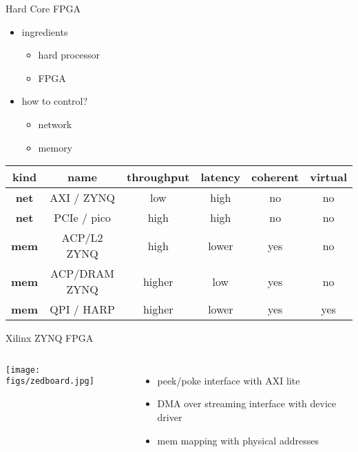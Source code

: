 \begin{frame}[fragile]{Hard Core FPGA}

\begin{itemize}
\item ingredients
\begin{itemize}
\item hard processor 
\item FPGA
\end{itemize}
\item how to control?
\begin{itemize}
\item network
\item memory
\end{itemize}

\end{itemize}

\vspace{0.5cm}

\begin{center}
\begin{footnotesize}
\begin{tabular}{|c|c|c|c|c|c|}
\hline
{\bf kind} & {\bf name} & {\bf throughput} &  {\bf latency} & {\bf coherent} & {\bf virtual} \\
\hline
\hline
{\bf net} & AXI / ZYNQ & low & high & no & no \\
\hline
{\bf net} & PCIe / pico & high & high & no & no \\
\hline
{\bf mem} & ACP/L2 ZYNQ & high & lower & yes & no \\
\hline
{\bf mem} & ACP/DRAM ZYNQ & higher & low & yes & no \\
\hline
{\bf mem} & QPI / HARP & higher & lower & yes & yes \\
\hline
\end{tabular}
\end{footnotesize}
\end{center}

\end{frame}

\begin{frame}[fragile]{Xilinx ZYNQ FPGA}
\begin{columns}
\begin{center}
\texttt{[image: figs/zedboard.jpg]} \\
\end{center}
\begin{itemize}
\item peek/poke interface with AXI lite
\item DMA over streaming interface with device driver
\item mem mapping with physical addresses
\end{itemize}
\end{columns}
\end{frame}

